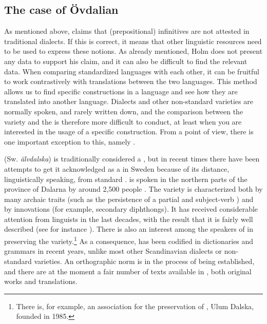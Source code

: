 \documentclass[output=paper]{langscibook}
\begin{document}
\subsection{The case of Övdalian}\label{sec:kalm:4.3}


As mentioned above, \citet[27]{Holm1967} claims that  (prepositional) infinitives are not attested in traditional dialects. If this is correct, it means that other linguistic resources need to be used to express these  notions. As already mentioned, Holm does not present any data to support his claim, and it can also be difficult to find the relevant data. When comparing standardized languages with each other, it can be fruitful to work contrastively with translations between the two languages. This method allows us to find specific constructions in a language and see how they are translated into another language. Dialects and other non-standard varieties are normally spoken, and rarely written down, and the comparison between the variety and the  is therefore more difficult to conduct, at least when you are interested in the usage of a specific construction. From a  point of view, there is one important exception to this, namely . 

 (Sw. \textit{älvdalska}) is traditionally considered a  , but in recent times there have been attempts to get it acknowledged as a  in Sweden because of its distance, linguistically speaking, from standard .  is spoken in the northern parts of the province of Dalarna by around 2,500 people \citep[27]{Garbacz2009}. The variety is characterized both by many archaic traits (such as the persistence of a partial  and subject-verb ) and by innovations (for example, secondary diphthongs). It has received considerable attention from linguists in the last decades, with the result that it is fairly well described (see for instance \citealt{Garbacz2009,BentzenEtAl2015}). There is also an interest among the speakers of  in preserving the variety.\footnote{There is, for example, an association for the preservation of , Ulum Dalska, founded in 1985.} As a consequence,  has been codified in dictionaries and grammars in recent years, unlike most other Scandinavian dialects or non-standard varieties. An orthographic norm is in the process of being established, and there are at the moment a fair number of texts available in , both original works and translations. 
\end{document}
